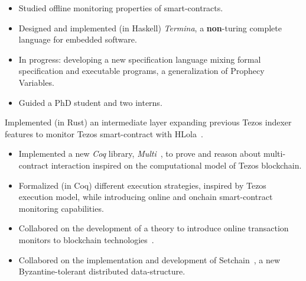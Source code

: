 
    \begin{itemize}
        \item Studied offline monitoring properties of smart-contracts.
        \item Designed and implemented (in Haskell) \emph{Termina}, a
            \textbf{non}-turing complete language for embedded software.
        \item In progress: developing a new specification language mixing formal
            specification and executable programs, a generalization of Prophecy Variables.
        \item Guided a PhD student and two interns.
    \end{itemize}
    \divider

        Implemented (in Rust) an intermediate layer expanding previous
            Tezos indexer features to monitor Tezos smart-contract with HLola~\cite{HLola}.

    \divider

    \begin{itemize}
        \item Implemented a new \emph{Coq} library,
            \emph{Multi}~\cite{Ceresa.2022.Multi}, to prove and reason about multi-contract
            interaction inspired on the computational model of Tezos blockchain.
        \item Formalized (in Coq) different execution strategies, inspired by
            Tezos execution model, while introducing online and onchain smart-contract
            monitoring capabilities.
        \item Collabored on the development of a theory to introduce
            online transaction monitors to blockchain
            technologies~\cite{Capretto.2022.TransactionMonitors}.
        \item Collabored on the implementation and development of
            Setchain~\cite{Capretto.2022.Setchain}, a new Byzantine-tolerant distributed
            data-structure.
    \end{itemize}
    \divider

